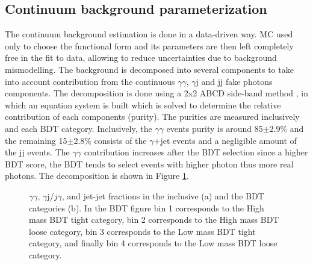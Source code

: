 \subsection{Continuum background parameterization}
\label{HHyybb:Modelling:Bkg}

The continuum background estimation is done in a data-driven way. MC used only to choose the functional form and its parameters are then left completely free in the fit to data, allowing to reduce uncertainties due to background mismodelling. The background is decomposed into several components to take into account contribution from the continuous $\gamma\gamma$, $\gamma$j and jj fake photons components. The decomposition is done using a 2x2 ABCD side-band method \cite{ABCD}, in which an equation system is built which is solved to determine the relative contribution of each components (purity). The purities are measured inclusively and each BDT category. Inclusively, the $\gamma\gamma$ events purity is around 85$\pm$2.9\% and the remaining 15$\pm$2.8\% consists of the $\gamma$+jet events and a negligible amount of the jj events. The $\gamma\gamma$ contribution increases after the BDT selection since a higher BDT score, the BDT tends to select events with higher photon \pT thus more real photons. The decomposition is shown in Figure \ref{fig:HHyybb:Modelling:Bkg:Decom}. 

\begin{figure}[htbp]
    \centering
    \caption{$\gamma\gamma$, $\gamma$j/$j\gamma$, and jet-jet fractions in the inclusive (a) and the BDT categories (b). In the BDT figure bin 1 corresponds to the High mass BDT tight category, bin 2 corresponds to the High mass BDT loose category, bin 3 corresponds to the Low mass BDT tight category, and finally bin 4 corresponds to the Low mass BDT loose category.}
    \label{fig:HHyybb:Modelling:Bkg:Decom}
\end{figure}

